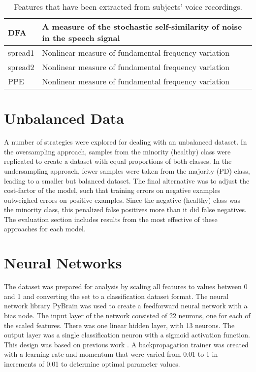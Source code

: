 \documentclass[draftcopy]{srpaper}
\begin{document}
\begin{table}
\begin{center}
\begin{tabular}{|l|p{10cm}|}
DFA & A measure of the stochastic self-similarity of noise in the
speech signal \\ \hline
spread1 & Nonlinear measure of fundamental frequency variation \\ \hline
spread2 & Nonlinear measure of fundamental frequency variation \\ \hline
PPE & Nonlinear measure of fundamental frequency variation \\ \hline
\end{tabular}
\end{center}
\caption[Features from Voice Recordings]{Features that have been extracted
  from subjects' voice recordings.}
\label{table:attributes}
\end{table}

\section{Unbalanced Data}
A number of strategies were explored for dealing with an unbalanced
dataset. In the oversampling approach, samples from the minority
(healthy) class were replicated to create a dataset
with equal proportions of both classes. 
In the undersampling approach, fewer samples were taken from the
majority (PD) class, leading to a smaller but balanced dataset. The final
alternative was to adjust the cost-factor of the model, such that
training errors on negative examples outweighed errors on positive
examples. Since the negative (healthy) class was the minority class,
this penalized false positives more than it did false negatives. The
evaluation section includes results from the most effective of these
approaches for each model.

\section{Neural Networks}
The dataset was prepared for analysis by scaling
all features to values between 0 and 1 and converting the set to a
classification dataset format. The neural network library PyBrain
\cite{pybrain} was used to create a feedforward neural network with a
bias node. The input layer of the network consisted of 22 neurons, one
for each of the scaled features. There was one linear hidden layer, with
13 neurons. The output layer was a single classification neuron with a
sigmoid activation function. This design was based on previous work
\cite{GJ70}. A backpropagation trainer was created with a learning
rate and momentum that were varied
from 0.01 to 1 in increments of 0.01 to determine optimal parameter values. 
\end{document}
